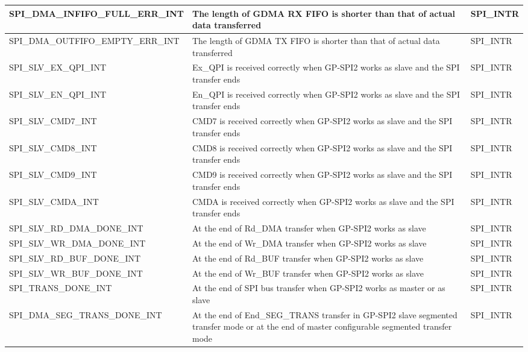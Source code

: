 \documentclass[main\_\_EN.tex]{subfiles}
\begin{document}
\begin{longtable}{ | L{6cm} | L{8.5cm} | L{2.5cm} | }
\label{int:SPIINFIFOFULLERRINT}SPI\_DMA\_INFIFO\_FULL\_ERR\_INT & The length of GDMA RX FIFO is shorter than that of actual data transferred &  SPI\_INTR  \\ \hline
\label{int:SPIOUTFIFOEMPTYERRINT}SPI\_DMA\_OUTFIFO\_EMPTY\_ERR\_INT & The length of GDMA TX FIFO is shorter than that of actual data transferred &  SPI\_INTR \\ \hline
\label{int:SPISLVEXQPIINT} SPI\_SLV\_EX\_QPI\_INT& Ex\_QPI is received correctly when GP-SPI2 works as slave and the SPI transfer ends& SPI\_INTR\\ \hline
\label{int:SPISLVENQPIINT} SPI\_SLV\_EN\_QPI\_INT & En\_QPI is received correctly when GP-SPI2  works as slave and the SPI transfer ends & SPI\_INTR \\ \hline
\label{int:SPISLVCMD7INT}SPI\_SLV\_CMD7\_INT & CMD7 is received correctly when GP-SPI2 works as slave and the SPI transfer ends& SPI\_INTR\\ \hline
\label{int:SPISLVCMD8INT}SPI\_SLV\_CMD8\_INT& CMD8 is received correctly when GP-SPI2 works as slave and the SPI transfer ends& SPI\_INTR\\ \hline
\label{int:SPISLVCMD9INT}SPI\_SLV\_CMD9\_INT & CMD9 is received correctly when GP-SPI2 works as slave and the SPI transfer ends& SPI\_INTR \\ \hline
\label{int:SPISLVCMDAINT}SPI\_SLV\_CMDA\_INT & CMDA is received correctly when GP-SPI2 works as slave and the SPI transfer ends& SPI\_INTR \\ \hline
\label{int:SPISLVRDDMADONEINT} SPI\_SLV\_RD\_DMA\_DONE\_INT & At the end of Rd\_DMA transfer when GP-SPI2 works as slave & SPI\_INTR\\ \hline
\label{int:SPISLVWRDMADONEINT}SPI\_SLV\_WR\_DMA\_DONE\_INT & At the end of Wr\_DMA transfer when GP-SPI2 works as slave & SPI\_INTR\\ \hline
\label{int:SPISLVRDBUFDONEINT}SPI\_SLV\_RD\_BUF\_DONE\_INT & At the end of Rd\_BUF transfer when GP-SPI2 works as slave & SPI\_INTR\\ \hline
\label{int:SPISLVWRBUFDONEINT}SPI\_SLV\_WR\_BUF\_DONE\_INT & At the end of Wr\_BUF transfer when GP-SPI2 works as slave & SPI\_INTR \\ \hline
\label{int:SPITRANSDONEINT}SPI\_TRANS\_DONE\_INT & At the end of SPI bus transfer when GP-SPI2 works as master or as slave & SPI\_INTR \\ \hline
\label{int:SPIDMASEGTRANSDONEINT}SPI\_DMA\_SEG\_TRANS\_DONE\_INT & At the end of End\_SEG\_TRANS transfer in GP-SPI2 slave segmented transfer mode or at the end of master configurable segmented transfer mode & SPI\_INTR\\ \hline

\end{longtable}
\end{document}
